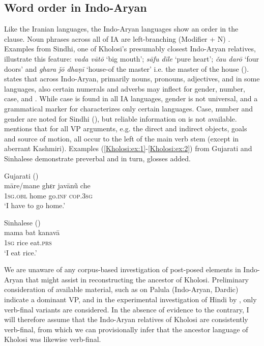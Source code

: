 \documentclass[output=paper,colorlinks,citecolor=brown]{langscibook}
\begin{document}
\subsection{Word order in Indo-Aryan}\label{Kholosi:ss:1.3}

Like the Iranian languages, the Indo-Aryan languages show an  order in the clause. Noun phrases across all of IA are left-branching (Modifier + N) \citet[370]{masica_indo-aryan_1991}. Examples from Sindhi, one of Kholosi's presumably closest Indo-Aryan relatives, illustrate this feature: \textit{vada vātō} `big mouth'; \textit{sāfu dīle} `pure heart'; \textit{čau darō} `four doors' and \textit{ghara ǰō dhaṇī} `house-of the master' i.e. the master of the house (\citealt[88, 119] {trumpp_grammar_1872}). \citet[218]{masica_indo-aryan_1991} states that across Indo-Aryan, primarily nouns, pronouns, adjectives, and in some languages, also certain numerals and adverbs may inflect for gender, number, case, and . While case is found in all IA languages, gender is not universal, and a grammatical marker for  characterizes only certain languages. Case, number and gender are noted for Sindhi (\citealt[119, 131]{trumpp_grammar_1872}), but reliable information on  is not available.
\citet[373]{masica_indo-aryan_1991} mentions that for all VP arguments, e.g. the direct and indirect objects, goals and source of motion, all occur to the left of the main verb stem (except in aberrant Kashmiri). Examples (\ref{Kholosi:ex:1}-\ref{Kholosi:ex:2})  from Gujarati and Sinhalese demonstrate preverbal  and  in turn, glosses added.

\ea\label{Kholosi:ex:1}
Gujarati (\citealt[352]{masica_indo-aryan_1991})\\
\gll māre/mane ghɛr jav\=an\~u che \\
\textsc{1sg.obl} home go\textsc{.inf} \textsc{cop.3sg} \\
\glt `I have to go home.'
\z

\ea\label{Kholosi:ex:2}
Sinhalese (\citealt[333]{masica_indo-aryan_1991})\\
\gll mama bat kanavā \\
\textsc{1sg} rice eat\textsc{.prs} \\
\glt `I eat rice.'
\z

We are unaware of any corpus-based investigation of post-posed elements in Indo-Aryan that might assist in reconstructing the ancestor  of Kholosi. Preliminary consideration of available material, such as \citet{liljegren_grammar_2016} on Palula (Indo-Aryan, Dardic) indicate a dominant  VP, and in the experimental investigation of Hindi  by \citet{patil_focus_2008}, only verb-final variants are considered. In the absence of evidence to the contrary, I will therefore assume that the Indo-Aryan relatives of Kholosi are consistently verb-final, from which we can provisionally infer that the ancestor language of Kholosi was likewise verb-final.
\end{document}

